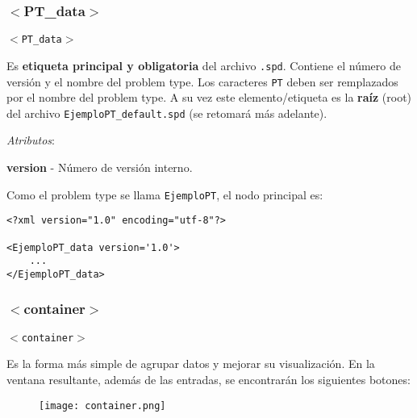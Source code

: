 \documentclass[10pt, a4paper, twocolumn]{article} %
\begin{document}
\subsubsection{$<$PT\_data$>$}

\vspace{0.20cm}
\begin{center}
	\texttt{$<$PT\_data$>$}
\end{center}
\vspace{0.20cm}

Es \textbf{etiqueta principal y obligatoria} del archivo \texttt{.spd}. Contiene el número de versión y el nombre del problem type. Los caracteres \texttt{PT} deben ser remplazados por el nombre del problem type. A su vez este elemento/etiqueta es la \textbf{raíz} (root) del archivo \texttt{EjemploPT\_default.spd} (se retomará más adelante).

\vspace{0.15cm}
\textit{Atributos}:

\vspace{0.15cm}
	\textbf{version} - Número de versión interno.
\vspace{0.15cm}

Como el problem type se llama \texttt{EjemploPT}, el nodo principal es:

\lstset{language=XML} 
\begin{lstlisting}[caption={Etiqueta principal que contiene la estructura del PT.}]
<?xml version="1.0" encoding="utf-8"?>

<EjemploPT_data version='1.0'>
	...
</EjemploPT_data>
\end{lstlisting}

\subsubsection{$<$container$>$}

\vspace{0.20cm}
\begin{center}
	\texttt{$<$container$>$}
\end{center}
\vspace{0.20cm}


Es la forma más simple de agrupar datos y mejorar su visualización. En la ventana resultante, además de las entradas, se encontrarán los siguientes botones:

\begin{figure}[hbtp!]
	\centering
	\texttt{[image: container.png]}
\end{figure}
\end{document}
